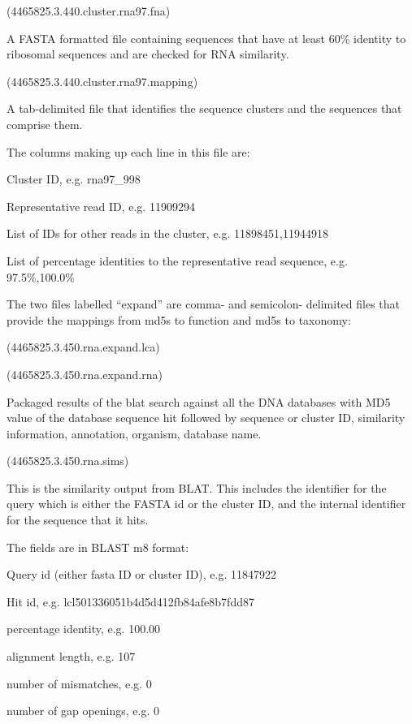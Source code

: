 \documentclass[letterpaper,10pt,english]{sphinxmanual}
\begin{document}
 (4465825.3.440.cluster.rna97.fna)

A FASTA formatted file containing sequences that have at least 60\%
identity to ribosomal sequences and are checked for RNA similarity.

 (4465825.3.440.cluster.rna97.mapping)

A tab-delimited file that identifies the sequence clusters and the
sequences that comprise them.

The columns making up each line in this file are:

Cluster ID, e.g. rna97\_998

Representative read ID, e.g. 11909294

List of IDs for other reads in the cluster, e.g. 11898451,11944918

List of percentage identities to the representative read sequence, e.g.
97.5\%,100.0\%


The two files labelled “expand” are comma- and semicolon- delimited
files that provide the mappings from md5s to function and md5s to
taxonomy:

 (4465825.3.450.rna.expand.lca)

 (4465825.3.450.rna.expand.rna)

Packaged results of the blat search against all the DNA databases with
MD5 value of the database sequence hit followed by sequence or cluster
ID, similarity information, annotation, organism, database name.

 (4465825.3.450.rna.sims)

This is the similarity output from BLAT. This includes the identifier
for the query which is either the FASTA id or the cluster ID, and the
internal identifier for the sequence that it hits.

The fields are in BLAST m8 format:

Query id (either fasta ID or cluster ID), e.g. 11847922

Hit id, e.g. lcl\textbar{}501336051b4d5d412fb84afe8b7fdd87

percentage identity, e.g. 100.00

alignment length, e.g. 107

number of mismatches, e.g. 0

number of gap openings, e.g. 0
\end{document}
